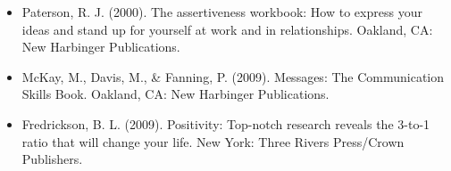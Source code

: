\documentclass{article}
\begin{document}
\begin{tiny}
\begin{itemize}
    \item Paterson, R. J. (2000). The assertiveness workbook: How to express your ideas and stand up for yourself at work and in relationships. Oakland, CA: New Harbinger Publications.
    \item McKay, M., Davis, M., \& Fanning, P. (2009). Messages: The Communication Skills Book. Oakland, CA: New Harbinger Publications.
    \item Fredrickson, B. L. (2009). Positivity: Top-notch research reveals the 3-to-1 ratio that will change your life. New York: Three Rivers Press/Crown Publishers.
\end{itemize}

\end{tiny}
\end{document}
